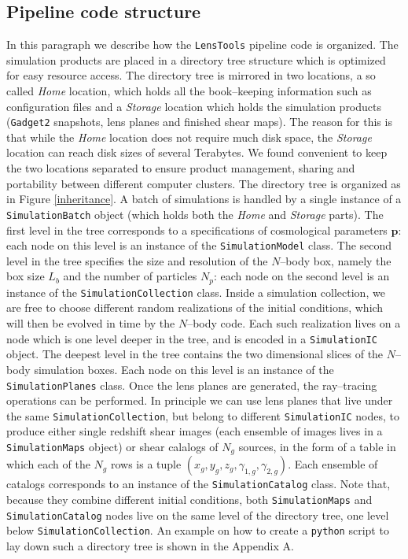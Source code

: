 \documentclass[reprint,aps,prd,superscriptaddress,showkeys,showpacs]{revtex4-1}
\newcommand{\bb}[1]{\mathbf{#1}}
\newcommand{\ttt}[1]{\texttt{#1}}
\newcommand{\LT}{\texttt{LensTools} }
\begin{document}
\subsection{Pipeline code structure}
%
In this paragraph we describe how the \LT pipeline code is organized. The simulation products are placed in a directory tree structure which is optimized for easy resource access. The directory tree is mirrored in two locations, a so called \textit{Home} location, which holds all the book--keeping information such as configuration files and a \textit{Storage} location which holds the simulation products (\ttt{Gadget2} snapshots, lens planes and finished shear maps). The reason for this is that while the \textit{Home} location does not require much disk space, the \textit{Storage} location can reach disk sizes of several Terabytes. We found convenient to keep the two locations separated to ensure product management, sharing and portability between different computer clusters. The directory tree is organized as in Figure \ref{inheritance}. A batch of simulations is handled by a single instance of a \ttt{SimulationBatch} object (which holds both the \textit{Home} and \textit{Storage} parts). The first level in the tree corresponds to a specifications of cosmological parameters $\bb{p}$: each node on this level is an instance of the \ttt{SimulationModel} class. The second level in the tree specifies the size and resolution of the $N$--body box, namely the box size $L_b$ and the number of particles $N_p$: each node on the second level is an instance of the \ttt{SimulationCollection} class. Inside a simulation collection, we are free to choose different random realizations of the initial conditions, which will then be evolved in time by the $N$--body code. Each such realization lives on a node which is one level deeper in the tree, and is encoded in a \ttt{SimulationIC} object. The deepest level in the tree contains the two dimensional slices of the $N$--body simulation boxes. Each node on this level is an instance of the \ttt{SimulationPlanes} class. Once the lens planes are generated, the ray--tracing operations can be performed. In principle we can use lens planes that live under the same \ttt{SimulationCollection}, but belong to different \ttt{SimulationIC} nodes, to produce either single redshift shear images (each ensemble of images lives in a \ttt{SimulationMaps} object) or shear calalogs of $N_g$ sources, in the form of a table in which each of the $N_g$ rows is a tuple $(x_g,y_g,z_g,\gamma_{1,g},\gamma_{2,g})$. Each ensemble of catalogs corresponds to an instance of the \ttt{SimulationCatalog} class. Note that, because they combine different initial conditions, both \ttt{SimulationMaps} and \ttt{SimulationCatalog} nodes live on the same level of the directory tree, one level below \ttt{SimulationCollection}. An example on how to create a \ttt{python} script to lay down such a directory tree is shown in the Appendix A.     
\end{document}

